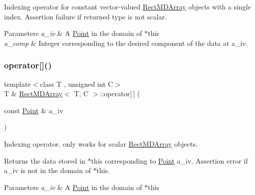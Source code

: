 Indexing operator for constant vector-\/valued \hyperlink{class_rect_m_d_array}{Rect\+M\+D\+Array} objects with a single index. Assertion failure if returned type is not scalar. 


\begin{DoxyParams}{Parameters}
{\em a\+\_\+iv} & A \hyperlink{class_point}{Point} in the domain of $\ast$this \\
\hline
{\em a\+\_\+comp} & Integer corresponding to the desired component of the data at a\+\_\+iv. \\
\hline
\end{DoxyParams}
\mbox{\label{class_rect_m_d_array_a19c1a43d52784a3b35e41fe1d7b70683}} 
\subsubsection{\texorpdfstring{operator[]()}{operator[]()}\hspace{0.1cm}{\footnotesize\ttfamily [1/2]}}
{\footnotesize\ttfamily template$<$class T , unsigned int C$>$ \\
T \& \hyperlink{class_rect_m_d_array}{Rect\+M\+D\+Array}$<$ T, C $>$\+::operator\mbox{[}$\,$\mbox{]} (\begin{DoxyParamCaption}\item[{const \hyperlink{class_point}{Point} \&}]{a\+\_\+iv }\end{DoxyParamCaption})\hspace{0.3cm}{\ttfamily [inline]}}



Indexing operator. only works for scalar \hyperlink{class_rect_m_d_array}{Rect\+M\+D\+Array} objects. 

Returns the data stored in $\ast$this corresponding to \hyperlink{class_point}{Point} a\+\_\+iv. Assertion error if a\+\_\+iv is not in the domain of $\ast$this. 
\begin{DoxyParams}{Parameters}
{\em a\+\_\+iv} & A \hyperlink{class_point}{Point} in the domain of $\ast$this \\
\hline
\end{DoxyParams}
\mbox{\label{class_rect_m_d_array_a32c67948460269cd7472db8d089e1198}} 
